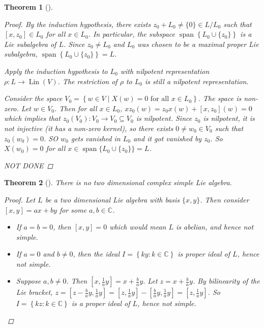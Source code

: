 \documentclass[letterpaper, 10pt]{article}
\theoremstyle{theostyle}
\newtheorem{theorem}{Theorem}[section]
\newenvironment{thmstyle}[1][]{%
    \begin{theorem}[#1]\leavevmode\vspace{-\baselineskip}\myquote%
    }{\endmyquote\end{theorem}}
\begin{document}
\begin{thmstyle}
\begin{proof}
        By the induction hypothesis, there exists \(z_0 + L_0 \neq \{0\} \in L/L_0\) such that \([x, z_0] \in L_0\) for all \(x \in L_0\).
        In particular, the subspace \(\operatorname{span}{\left\{L_0 \cup \{z_0\}\right\}}\) is a Lie subalgebra of \(L\).
        Since \(z_0 \neq L_0\) and \(L_0\) was chosen to be a maximal proper Lie subalgebra, \(\operatorname{span}{\left\{L_0 \cup \{z_0\}\right\}} = L\).

        Apply the induction hypothesis to \(L_0\) with nilpotent representation \(\rho:L \rightarrow \operatorname{Lin}{(V)}\).
        The restriction of \(\rho\) to \(L_0\) is still a nilpotent representation.

        Consider the space \(V_0 = \left\{ w \in V \mid X(w) = 0 \text{ for all } x \in L_0\right\}\).
        The space is non-zero.
        Let \(w \in V_0\).
        Then for all \(x \in L_0\), \(xz_0(w) = z_0x(w) + [x, z_0](w) = 0\) which implies that \(z_0(V_0): V_0 \rightarrow V_0 \subseteq V_0\) is nilpotent.
        Since \(z_0\) is nilpotent, it is not injective (it has a non-zero kernel), so there exists \(0 \neq w_0 \in V_0\) such that \(z_0 (w_0) = 0\).
        SO \(w_0\) gets vanished in \(L_0\) and it got vanished by \(z_0\).
        So \(X(w_0) = 0\) for all \(x \in \operatorname{span}{\{L_0 \cup \{z_0\}\}} = L\).

        NOT DONE

    \end{proof}
\end{thmstyle}

\begin{thmstyle}
    There is no two dimensional complex simple Lie algebra.
    \begin{proof}
        Let \(L\) be a two dimensional Lie algebra with basis \(\{x, y\}\).
        Then consider \([x, y] = ax + by\) for some \(a, b \in \mathbb{C}\).
        \begin{itemize}
            \item If \(a = b = 0\), then \([x, y] = 0\) which would mean \(L\) is abelian, and hence not simple.
            \item If \(a = 0\) and \(b \neq 0\), then the ideal \(I = \left\{ky : k \in \mathbb{C}\right\}\) is proper ideal of \(L\), hence not simple.
            \item Suppose \(a, b \neq 0\).
            Then \(\left[x, \frac{1}{a} y \right] = x + \frac{b}{a}y\).
            Let \(z = x + \frac{b}{a}y\).
            By bilinearity of the Lie bracket,
            \(z = \left[z - \frac{b}{a}y, \frac{1}{a} y \right] = \left[z, \frac{1}{a} y \right] - \left[\frac{b}{a}y, \frac{1}{a} y \right] = \left[z, \frac{1}{a} y \right]\).
            So \(I = \left\{kz : k \in \mathbb{C} \right\}\) is a proper ideal of \(L\), hence not simple.
        \end{itemize}
    \end{proof}
\end{thmstyle}
\end{document}
